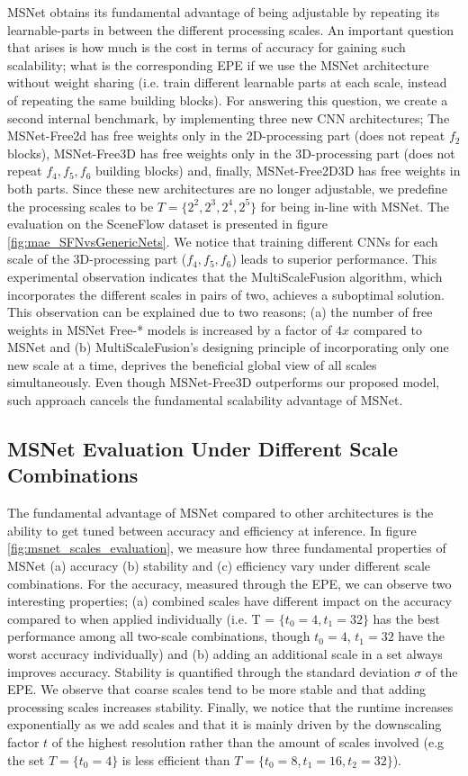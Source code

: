 \documentclass[runningheads]{llncs}
\begin{document}
MSNet obtains its fundamental advantage of being adjustable by repeating its learnable-parts in between the different processing scales. An important question that arises is how much is the cost in terms of accuracy for gaining such scalability; what is the corresponding EPE if we use the MSNet architecture without weight sharing (i.e. train different learnable parts at each scale, instead of repeating the same building blocks). For answering this question, we create a second internal benchmark, by implementing three new CNN architectures; The MSNet-Free2d has free weights only in the 2D-processing part (does not repeat $f_2$ blocks), MSNet-Free3D has free weights only in the 3D-processing part (does not repeat $f_4, f_5, f_6$ building blocks) and, finally, MSNet-Free2D3D has free weights in both parts. Since these new architectures are no longer adjustable, we predefine the processing scales to be $T = \{2^2, 2^3, 2^4, 2^5\}$ for being in-line with MSNet. The evaluation on the SceneFlow dataset is presented in figure \ref{fig:mae_SFNvsGenericNets}. We notice that training different CNNs for each scale of the 3D-processing part ($f_4, f_5, f_6$) leads to superior performance. This experimental observation indicates that the MultiScaleFusion algorithm, which incorporates the different scales in pairs of two, achieves a suboptimal solution. This observation can be explained due to two reasons; (a) the number of free weights in MSNet Free-* models is increased by a factor of $4x$ compared to MSNet and (b) MultiScaleFusion's designing principle of incorporating only one new scale at a time, deprives the beneficial global view of all scales simultaneously. Even though MSNet-Free3D outperforms our proposed model, such approach cancels the fundamental scalability advantage of MSNet.

\subsection{MSNet Evaluation Under Different Scale Combinations}

The fundamental advantage of MSNet compared to other architectures is the ability to get tuned between accuracy and efficiency at inference. In figure \ref{fig:msnet_scales_evaluation}, we measure how three fundamental properties of MSNet (a) accuracy (b) stability and (c) efficiency vary under different scale combinations. For the accuracy, measured through the EPE, we can observe two interesting properties; (a) combined scales have different impact on the accuracy compared to when applied individually (i.e. T = $\{t_0=4,t_1=32\}$ has the best performance among all two-scale combinations, though $t_0=4$, $t_1=32$ have the worst accuracy individually) and (b) adding an additional scale in a set always improves accuracy. Stability is quantified through the standard deviation $\sigma$ of the EPE. We observe that coarse scales tend to be more stable and that adding processing scales increases stability. Finally, we notice that the runtime increases exponentially as we add scales and that it is mainly driven by the downscaling factor $t$ of the highest resolution rather than the amount of scales involved (e.g the set $T = \{t_0=4\}$ is less efficient than $T = \{t_0=8, t_1 = 16, t_2 =32\}$).
\end{document}
